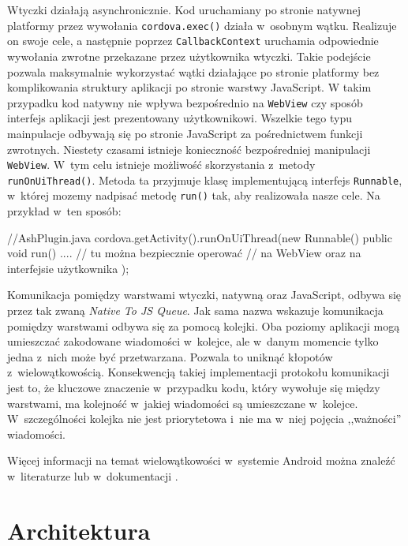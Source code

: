 \documentclass[brudnopis]{xmgr}
\begin{document}
Wtyczki działają asynchronicznie. Kod uruchamiany po stronie natywnej platformy przez wywołania \texttt{cordova.exec()} działa w~osobnym wątku. Realizuje on swoje cele, a następnie poprzez \texttt{CallbackContext} uruchamia odpowiednie wywołania zwrotne przekazane przez użytkownika wtyczki. Takie podejście pozwala maksymalnie wykorzystać wątki działające po stronie platformy bez komplikowania struktury aplikacji po stronie warstwy JavaScript. W takim przypadku kod natywny nie wpływa bezpośrednio na \texttt{WebView} czy sposób interfejs aplikacji jest prezentowany użytkownikowi. Wszelkie tego typu mainpulacje odbywają się po stronie JavaScript za pośrednictwem funkcji zwrotnych. Niestety czasami istnieje konieczność bezpośredniej manipulacji \texttt{WebView}. W~tym celu istnieje możliwość skorzystania z~metody \texttt{runOnUiThread()}. Metoda ta przyjmuje klasę implementującą interfejs \texttt{Runnable}, w~której mozemy nadpisać metodę \texttt{run()} tak, aby realizowała nasze cele. Na przykład w~ten sposób:

\begin{javascriptcode}
//AshPlugin.java
cordova.getActivity().runOnUiThread(new Runnable() {
      public void run() {
   	....        
         // tu można bezpiecznie operować 
         //    na WebView oraz na interfejsie użytkownika
      }
});
\end{javascriptcode}

Komunikacja pomiędzy warstwami wtyczki, natywną oraz JavaScript, odbywa się przez tak zwaną \textit{Native To JS Queue}. Jak sama nazwa wskazuje komunikacja pomiędzy warstwami odbywa się za pomocą kolejki. Oba poziomy aplikacji mogą umieszczać zakodowane wiadomości w~kolejce, ale w~danym momencie tylko jedna z~nich może być przetwarzana. Pozwala to uniknąć kłopotów z~wielowątkowością. Konsekwencją takiej implementacji protokołu komunikacji jest to, że kluczowe znaczenie w~przypadku kodu, który wywołuje się między warstwami,  ma kolejność w~jakiej wiadomości są umieszczane w~kolejce. W~szczególności kolejka nie jest priorytetowa i~nie ma w~niej pojęcia ,,ważności'' wiadomości.

Więcej informacji na temat wielowątkowości w~systemie Android można znaleźć w~literaturze \cite{AndroidInPractice} lub w~dokumentacji \cite{AndroidDoc}. 

\chapter{Architektura}
\end{document}
